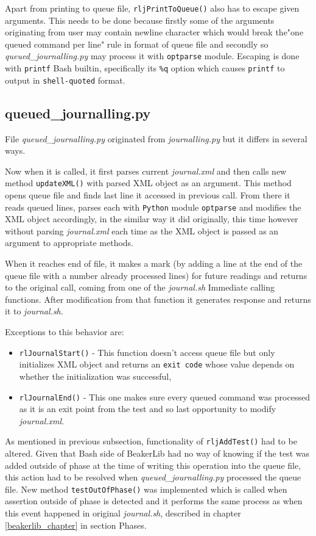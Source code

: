 Apart from printing to queue file, \texttt{rljPrintToQueue()} also has to escape given arguments. This needs to be done because firstly some of the arguments originating from user may contain newline character which would break the"one queued command per line" rule in format of queue file and secondly so \textit{queued\_journalling.py} may process it with \texttt{optparse} module.
Escaping is done with \texttt{printf} Bash builtin\cite{bash_builtins}, specifically its \texttt{\%q} option which causes \texttt{printf} to output in \texttt{shell-quoted} format.

\subsection{queued\_journalling.py}
File \textit{queued\_journalling.py} originated from \textit{journalling.py} but it differs in several ways.

Now when it is called, it first parses current \textit{journal.xml} and then calls new method \texttt{updateXML()} with parsed XML object as an argument. This method opens queue file and finds last line it accessed in previous call. From there it reads queued lines, parses each with \texttt{Python} module \texttt{optparse} and modifies the XML object accordingly, in the similar way it did originally, this time however without parsing \textit{journal.xml} each time as the XML object is passed as an argument to appropriate methods. 

When it reaches end of file, it makes a mark (by adding a line at the end of the queue file with a number already processed lines) for future readings and returns to the original call, coming from one of the \textit{journal.sh} Immediate calling functions. After modification from that function it generates response and returns it to \textit{journal.sh}. 

Exceptions to this behavior are:
\begin{itemize}
\item \texttt{rlJournalStart()} - This function doesn't access queue file but only initializes XML object and returns an \texttt{exit code} whose value depends on whether the initialization was successful,
\item \texttt{rlJournalEnd()} - This one makes sure every queued command was processed as it is an exit point from the test and so last opportunity to modify \textit{journal.xml}.
\end{itemize}

As mentioned in previous subsection, functionality of  \texttt{rljAddTest()} had to be altered. Given that Bash side of BeakerLib had no way of knowing if the test was added outside of phase at the time of writing this operation into the queue file, this action had to be resolved when \textit{queued\_journalling.py} processed the queue file. 
New method \texttt{testOutOfPhase()} was implemented which is called when assertion outside of phase is detected and it performs the same process as when this event happened in original \textit{journal.sh}, described in chapter \ref{beakerlib_chapter} in section Phases.

